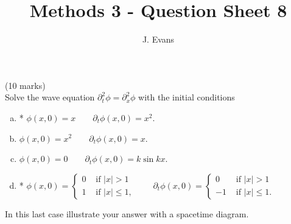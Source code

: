 \documentclass[12pt]{article}
\title{Methods 3 - Question Sheet 8}
\author{J. Evans}
\date{}
\begin{document}
\maketitle


\begin{question}(10 marks)\\
Solve the wave equation $\partial_t^2\phi=\partial_x^2\phi$ with the initial conditions
\begin{enumerate}[(a)]
\item * $\phi(x,0)=x\qquad\partial_t\phi(x,0)=x^2$.
\item $\phi(x,0)=x^2\qquad\partial_t\phi(x,0)=x$.
\item $\phi(x,0)=0\qquad\partial_t\phi(x,0)=k\sin kx$.
\item * $\phi(x,0)=\begin{cases}
0 & \mbox{ if }|x|>1\\
1 & \mbox{ if }|x|\leq 1,
\end{cases}\qquad\partial_t\phi(x,0)=\begin{cases}
0 & \mbox{ if }|x|>1\\
-1 & \mbox{ if }|x|\leq 1.
\end{cases}$
\end{enumerate}
In this last case illustrate your answer with a spacetime diagram.
\end{question}
\end{document}
